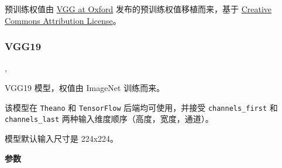 预训练权值由
\href{http://www.robots.ox.ac.uk/~vgg/research/very_deep/}{VGG at
Oxford} 发布的预训练权值移植而来，基于
\href{https://creativecommons.org/licenses/by/4.0/}{Creative Commons
Attribution License}。



\subsubsection{VGG19}\label{vgg19}

\begin{Shaded}
\begin{Highlighting}[]
\OperatorTok{=}\OperatorTok{=}, \\
\hspace{3cm}\OperatorTok{=}\OperatorTok{=}\OperatorTok{=}\OperatorTok{=}\NormalTok{)}
\end{Highlighting}
\end{Shaded}

VGG19 模型，权值由 ImageNet 训练而来。

该模型在 \texttt{Theano} 和 \texttt{TensorFlow} 后端均可使用，并接受
\texttt{channels\_first} 和 \texttt{channels\_last}
两种输入维度顺序（高度，宽度，通道）。

模型默认输入尺寸是 224x224。

\textbf{参数}\label{ux53c2ux6570-2}

